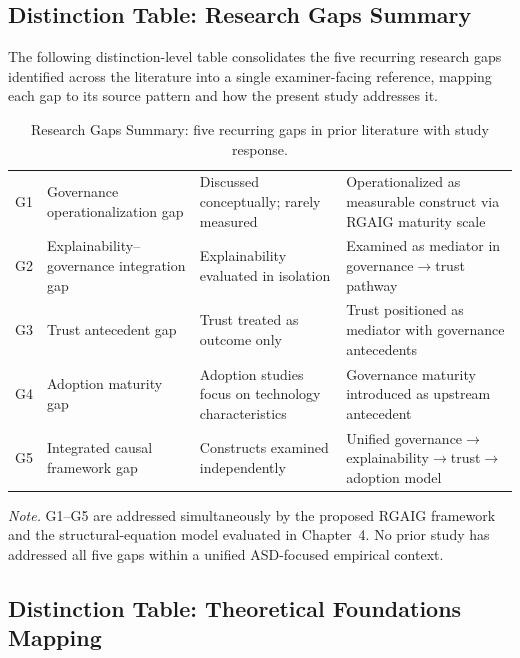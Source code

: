 \subsection{Distinction Table: Research Gaps Summary}
\label{sec:distinction_research_gap}

\noindent The following distinction-level table consolidates the five recurring research gaps identified across the literature into a single examiner-facing reference, mapping each gap to its source pattern and how the present study addresses it.

{\tablestripes\tablefontsize
{}
\begin{xltabular}{\textwidth}{@{} >{\centering\arraybackslash}p{0.7cm} >{\raggedright\arraybackslash}p{3.3cm} L L @{}}
\caption[Research Gaps Summary]{Research Gaps Summary: five recurring gaps in prior literature with study response.}\label{tab:distinction_research_gaps} \\
\toprule
{} &  &  &  \\
\midrule
\endfirsthead
\endhead
\bottomrule
\endlastfoot
G1 & Governance operationalization gap & Discussed conceptually; rarely measured & Operationalized as measurable construct via RGAIG maturity scale \\
\addlinespace
G2 & Explainability--governance integration gap & Explainability evaluated in isolation & Examined as mediator in governance$\rightarrow$trust pathway \\
\addlinespace
G3 & Trust antecedent gap & Trust treated as outcome only & Trust positioned as mediator with governance antecedents \\
\addlinespace
G4 & Adoption maturity gap & Adoption studies focus on technology characteristics & Governance maturity introduced as upstream antecedent \\
\addlinespace
G5 & Integrated causal framework gap & Constructs examined independently & Unified governance$\rightarrow$explainability$\rightarrow$trust$\rightarrow$adoption model \\
\end{xltabular}}
\vspace{0.3em}\noindent\textit{Note.} G1--G5 are addressed simultaneously by the proposed RGAIG framework and the structural-equation model evaluated in Chapter~4. No prior study has addressed all five gaps within a unified ASD-focused empirical context.


\subsection{Distinction Table: Theoretical Foundations Mapping}
\label{sec:distinction_theory_mapping}

